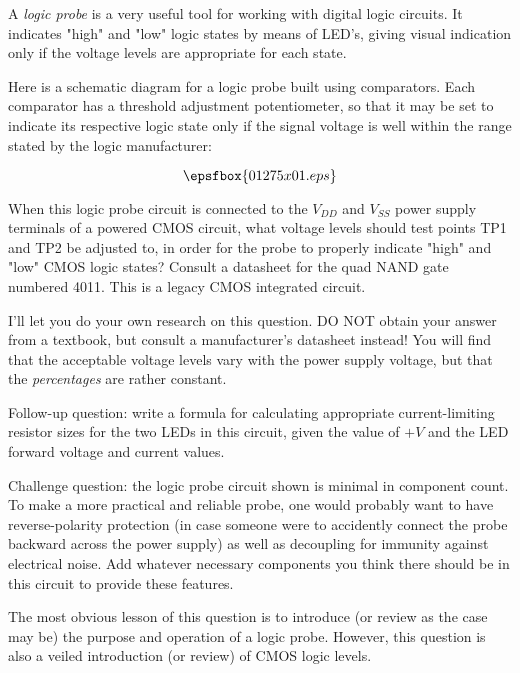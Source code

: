 

A {\it logic probe} is a very useful tool for working with digital logic circuits.  It indicates "high" and "low" logic states by means of LED's, giving visual indication only if the voltage levels are appropriate for each state.

Here is a schematic diagram for a logic probe built using comparators.  Each comparator has a threshold adjustment potentiometer, so that it may be set to indicate its respective logic state only if the signal voltage is well within the range stated by the logic manufacturer:

$$\epsfbox{01275x01.eps}$$

When this logic probe circuit is connected to the $V_{DD}$ and $V_{SS}$ power supply terminals of a powered CMOS circuit, what voltage levels should test points TP1 and TP2 be adjusted to, in order for the probe to properly indicate "high" and "low" CMOS logic states?  Consult a datasheet for the quad NAND gate numbered 4011.  This is a legacy CMOS integrated circuit.






I'll let you do your own research on this question.  DO NOT obtain your answer from a textbook, but consult a manufacturer's datasheet instead!  You will find that the acceptable voltage levels vary with the power supply voltage, but that the {\it percentages} are rather constant.

\vskip 10pt

Follow-up question: write a formula for calculating appropriate current-limiting resistor sizes for the two LEDs in this circuit, given the value of $+V$ and the LED forward voltage and current values.

\vskip 10pt

Challenge question: the logic probe circuit shown is minimal in component count.  To make a more practical and reliable probe, one would probably want to have reverse-polarity protection (in case someone were to accidently connect the probe backward across the power supply) as well as decoupling for immunity against electrical noise.  Add whatever necessary components you think there should be in this circuit to provide these features.







The most obvious lesson of this question is to introduce (or review as the case may be) the purpose and operation of a logic probe.  However, this question is also a veiled introduction (or review) of CMOS logic levels.




